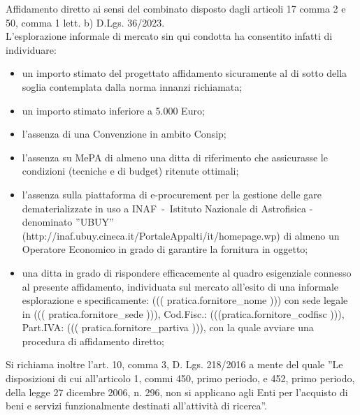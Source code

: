 
Affidamento diretto ai sensi del combinato disposto dagli articoli 17 comma 2 e 50, comma 1 lett. b) D.Lgs. 36/2023.\\
L’esplorazione informale di mercato sin qui condotta ha consentito infatti di individuare:
\begin{itemize}
\item un importo stimato del progettato affidamento sicuramente al di sotto della soglia contemplata dalla norma innanzi richiamata;
\item un importo stimato inferiore a 5.000 Euro;
\item l’assenza di una Convenzione in ambito Consip;
\item l'assenza su MePA di almeno una ditta di riferimento che assicurasse le condizioni (tecniche e di budget) ritenute ottimali;
\item l'assenza sulla piattaforma di e-procurement per la gestione delle gare dematerializzate in uso a
	INAF~-~Istituto Nazionale di Astrofisica - denominato ''UBUY''
	(http://inaf.ubuy.cineca.it/PortaleAppalti/it/homepage.wp) di almeno un Operatore Economico in
	grado di garantire la fornitura in oggetto;

\item una ditta in grado di rispondere efficacemente al quadro esigenziale connesso al presente affidamento,
individuata sul mercato all’esito di una informale esplorazione e specificamente:
((( pratica.fornitore_nome ))) con sede legale in ((( pratica.fornitore_sede ))),
Cod.Fisc.: (((pratica.fornitore_codfisc ))), Part.IVA: ((( pratica.fornitore_partiva ))),
con la quale avviare una procedura di affidamento diretto;
\end{itemize}

Si richiama inoltre l’art. 10, comma 3, D. Lgs. 218/2016 a mente
del quale ''Le disposizioni di cui all'articolo 1, commi 450, primo
periodo, e 452, primo periodo, della legge 27 dicembre 2006, n. 296, non
si applicano agli Enti per l'acquisto di beni e servizi funzionalmente
destinati all'attività di ricerca''.


